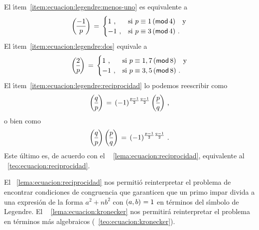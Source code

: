 \begin{obsEcuacion}\label{obs:ecuacion:legendre}
	El \'{\i}tem~\eqref{item:ecuacion:legendre:menos-uno} es equivalente
	a
	\begin{displaymath}
		\legendre{-1} p\,=\,\begin{cases}
				1 \text{ ,} & \text{si }p\equiv 1\tmodulo[4]
					\quad\text{y} \\
				-1\text{ ,} & \text{si }p\equiv 3\tmodulo[4]
					\text{ .}
			\end{cases}
	\end{displaymath}
	El \'{\i}tem~\eqref{item:ecuacion:legendre:dos} equivale a
	\begin{displaymath}
		\legendre 2{p}\,=\,\begin{cases}
				1 \text{ ,} & \text{si }p\equiv 1,7\tmodulo[8]
					\quad\text{y} \\
				-1\text{ ,} & \text{si }p\equiv 3,5\tmodulo[8]
					\text{ .}
			\end{cases}
	\end{displaymath}
	El \'{\i}tem~\eqref{item:ecuacion:legendre:reciprocidad} lo podemos
	reescribir como
	\begin{displaymath}
		\legendre q{p}\,=\,(-1)^{\frac{p-1} 2\frac{q-1} 2}\,
			\legendre p{q}
		\text{ ,}
	\end{displaymath}
	o bien como
	\begin{displaymath}
		\legendre q{p}\,\legendre p{q}\,=\,
			(-1)^{\frac{p-1} 2\frac{q-1} 2}
		\text{ .}
	\end{displaymath}
	Este \'ultimo es, de acuerdo con el \lemaname~%
	\ref{lema:ecuacion:reciprocidad}, equivalente al
	\teoname~\ref{teo:ecuacion:reciprocidad}.
\end{obsEcuacion}

El \lemaname~\ref{lema:ecuacion:reciprocidad} nos permiti\'o reinterpretar el
problema de encontrar condiciones de congruencia que garanticen que un
primo impar divida a una expresi\'on de la forma $a^2+nb^2$ con $\left({a,b}\right)_{}=1$
en t\'erminos del s\'{\i}mbolo de Legendre. El \lemaname~%
\ref{lema:ecuacion:kronecker} nos permitir\'a reinterpretar el problema en
t\'erminos m\'as algebraicos (\teoname~\ref{teo:ecuacion:kronecker}).

